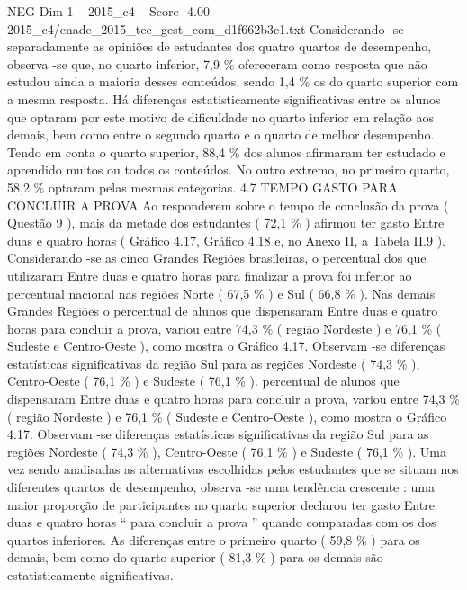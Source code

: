 \begin{textsample}{NEG Dim 1 – 2015\_c4 – Score -4.00 – 2015\_c4/enade\_2015\_tec\_gest\_com\_d1f662b3e1.txt}
Considerando -se separadamente as opiniões de estudantes dos quatro quartos de desempenho, observa -se que, no quarto inferior, 7,9 \% ofereceram como resposta que não estudou ainda a maioria desses conteúdos, sendo 1,4 \% os do quarto superior com a mesma resposta.
Há diferenças estatisticamente significativas entre os alunos que optaram por este motivo de dificuldade no quarto inferior em relação aos demais, bem como entre o segundo quarto e o quarto de melhor desempenho.
Tendo em conta o quarto superior, 88,4 \% dos alunos afirmaram ter estudado e aprendido muitos ou todos os conteúdos.
No outro extremo, no primeiro quarto, 58,2 \% optaram pelas mesmas categorias. 4.7 TEMPO GASTO PARA CONCLUIR A PROVA Ao responderem sobre o tempo de conclusão da prova ( Questão 9 ), mais da metade dos estudantes ( 72,1 \% ) afirmou ter gasto Entre duas e quatro horas ( Gráfico 4.17, Gráfico 4.18 e, no Anexo II, a Tabela II.9 ).
Considerando -se as cinco Grandes Regiões brasileiras, o percentual dos que utilizaram Entre duas e quatro horas para finalizar a prova foi inferior ao percentual nacional nas regiões Norte ( 67,5 \% ) e Sul ( 66,8 \% ).
Nas demais Grandes Regiões o percentual de alunos que dispensaram Entre duas e quatro horas para concluir a prova, variou entre 74,3 \% ( região Nordeste ) e 76,1 \% ( Sudeste e Centro-Oeste ), como mostra o Gráfico 4.17.
Observam -se diferenças estatísticas significativas da região Sul para as regiões Nordeste ( 74,3 \% ), Centro-Oeste ( 76,1 \% ) e Sudeste ( 76,1 \% ). percentual de alunos que dispensaram Entre duas e quatro horas para concluir a prova, variou entre 74,3 \% ( região Nordeste ) e 76,1 \% ( Sudeste e Centro-Oeste ), como mostra o Gráfico 4.17.
Observam -se diferenças estatísticas significativas da região Sul para as regiões Nordeste ( 74,3 \% ), Centro-Oeste ( 76,1 \% ) e Sudeste ( 76,1 \% ).
Uma vez sendo analisadas as alternativas escolhidas pelos estudantes que se situam nos diferentes quartos de desempenho, observa -se uma tendência crescente : uma maior proporção de participantes no quarto superior declarou ter gasto Entre duas e quatro horas “ para concluir a prova ” quando comparadas com os dos quartos inferiores.
As diferenças entre o primeiro quarto ( 59,8 \% ) para os demais, bem como do quarto superior ( 81,3 \% ) para os demais são estatisticamente significativas.

\end{textsample}
